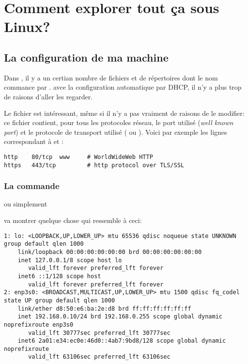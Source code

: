 \section{Comment explorer tout ça sous Linux?}\label{netlinux}
\subsection{La configuration de ma machine}
Dans , il y a un certian nombre de fichiers et de
répertoires dont le nom commance par . avce la
configuration automatique par DHCP, il n'y a plus trop de raisons
d'aller les regarder.

Le fichier  est intéressant, même si il n'y a pas
vraiment de raisons de le modifier: ce fichier contient, pour \og
tous\fg{} les protocoles réseau, le port utilisé (\emph{well known
  port}) et le protocole de transport utilisé ( ou
). Voici par exemple les lignes correspondant à  et
  : 
\begin{verbatim}
http	80/tcp	www		# WorldWideWeb HTTP
https	443/tcp			# http protocol over TLS/SSL
\end{verbatim}

\subsubsection{La commande }

 ou simplement 

va montrer quelque chose qui ressemble à ceci:

{\small
\begin{verbatim}
1: lo: <LOOPBACK,UP,LOWER_UP> mtu 65536 qdisc noqueue state UNKNOWN group default qlen 1000
    link/loopback 00:00:00:00:00:00 brd 00:00:00:00:00:00
    inet 127.0.0.1/8 scope host lo
       valid_lft forever preferred_lft forever
    inet6 ::1/128 scope host 
       valid_lft forever preferred_lft forever
2: enp3s0: <BROADCAST,MULTICAST,UP,LOWER_UP> mtu 1500 qdisc fq_codel state UP group default qlen 1000
    link/ether d8:50:e6:ba:2e:d8 brd ff:ff:ff:ff:ff:ff
    inet 192.168.0.10/24 brd 192.168.0.255 scope global dynamic noprefixroute enp3s0
       valid_lft 30777sec preferred_lft 30777sec
    inet6 2a01:e34:ec0e:46d0::4ab7:9bd8/128 scope global dynamic noprefixroute 
       valid_lft 63106sec preferred_lft 63106sec
\end{verbatim}        
}

